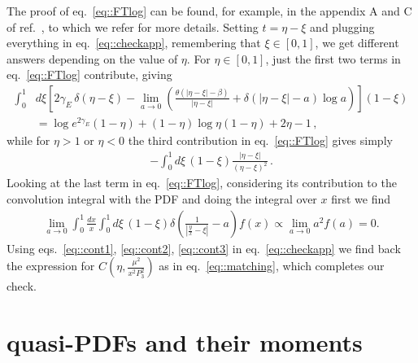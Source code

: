 The proof of eq.~\eqref{eq::FTlog} can be found, for example, in the appendix A
and C of ref.~\cite{Izubuchi:2018srq}, to which we refer for more details.
Setting $t = \eta-\xi $ and plugging everything in eq.~\eqref{eq::checkapp},
remembering that $\xi \in \left[0,1\right]$, we get different answers depending
on the value of $\eta$. For $\eta \in \left[0,1\right]$, just the first two
terms in eq.~\eqref{eq::FTlog} contribute, giving
\begin{align}
    \label{eq::cont1}
    \int_0^1 &d\xi \left[2 \gamma_E \, \delta\left(\eta-\xi\right) -
    \lim_{a\rightarrow 0}
    \left(\frac{\theta\left(|\eta-\xi|-\beta\right)}{|\eta-\xi|} +  
    \delta\left(|\eta-\xi|-a\right)\log a\right)\right]
    \left(1-\xi\right) \nonumber \\
    & = \log{e^{2\gamma_E}}\left(1-\eta\right) + 
    \left(1-\eta\right)\log{\eta\left(1-\eta\right)} +2\eta -1\, ,
\end{align}
while for $\eta > 1$ or $\eta < 0$ the third contribution in eq.~\eqref{eq::FTlog} gives simply
\begin{align}
    \label{eq::cont2}
    -\int_0^1 d\xi\, \left(1-\xi\right)\frac{|\eta-\xi|}{\left(\eta-\xi\right)^2}\, .
\end{align}
Looking at the last term in eq.~\eqref{eq::FTlog}, considering its contribution
to the convolution integral with the PDF and doing the integral over $x$ first
we find
\begin{align}
    \label{eq::cont3}
    \lim_{a\rightarrow 0}\int_0^1 \frac{dx}{x}\int_0^1 d\xi \,\left(1-\xi\right)
    \delta\left(\frac{1}{|\frac{y}{x}-\xi|} - a\right)f\left(x\right) 
    \propto \lim_{a\rightarrow 0} a^2 f\left(a\right) = 0.
\end{align}
Using eqs.~\eqref{eq::cont1}, \eqref{eq::cont2}, \eqref{eq::cont3} in
eq.~\eqref{eq::checkapp} we find back the expression for
$C\left(\eta,\frac{\mu^2}{x^2 P_3^2}\right)$ as in eq.~\eqref{eq::matching},
which completes our check.

\section{quasi-PDFs and their moments}
\label{app:moments}

